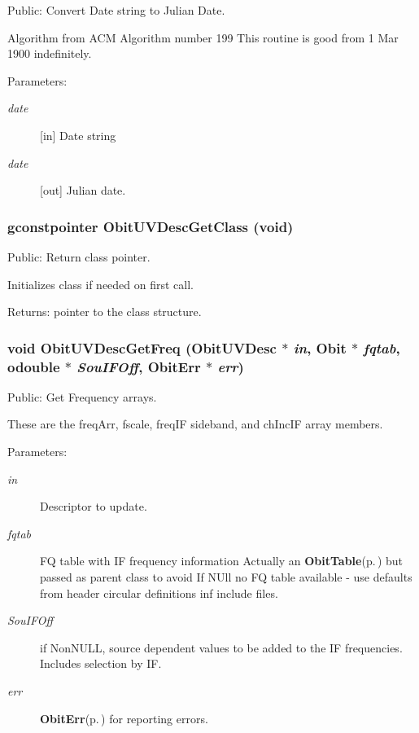 Public: Convert Date string to Julian Date. 

Algorithm from ACM Algorithm number 199 This routine is good from 1 Mar 1900 indefinitely. \begin{Desc}
\item[Parameters:]
\begin{description}
\item[{\em date}][in] Date string \item[{\em date}][out] Julian date. \end{description}
\end{Desc}
\subsubsection{\setlength{\rightskip}{0pt plus 5cm}gconstpointer Obit\-UVDesc\-Get\-Class (void)}\label{ObitUVDesc_8c_a10}


Public: Return class pointer. 

Initializes class if needed on first call. \begin{Desc}
\item[Returns:]pointer to the class structure. \end{Desc}
\subsubsection{\setlength{\rightskip}{0pt plus 5cm}void Obit\-UVDesc\-Get\-Freq ({\bf Obit\-UVDesc} $\ast$ {\em in}, {\bf Obit} $\ast$ {\em fqtab}, {\bf odouble} $\ast$ {\em Sou\-IFOff}, {\bf Obit\-Err} $\ast$ {\em err})}\label{ObitUVDesc_8c_a16}


Public: Get Frequency arrays. 

These are the freq\-Arr, fscale, freq\-IF sideband, and ch\-Inc\-IF array members. \begin{Desc}
\item[Parameters:]
\begin{description}
\item[{\em in}]Descriptor to update. \item[{\em fqtab}]FQ table with IF frequency information Actually an {\bf Obit\-Table}{\rm (p.\,\pageref{structObitTable})} but passed as parent class to avoid If NUll no FQ table available - use defaults from header circular definitions inf include files. \item[{\em Sou\-IFOff}]if Non\-NULL, source dependent values to be added to the IF frequencies. Includes selection by IF. \item[{\em err}]{\bf Obit\-Err}{\rm (p.\,\pageref{structObitErr})} for reporting errors. \end{description}
\end{Desc}
